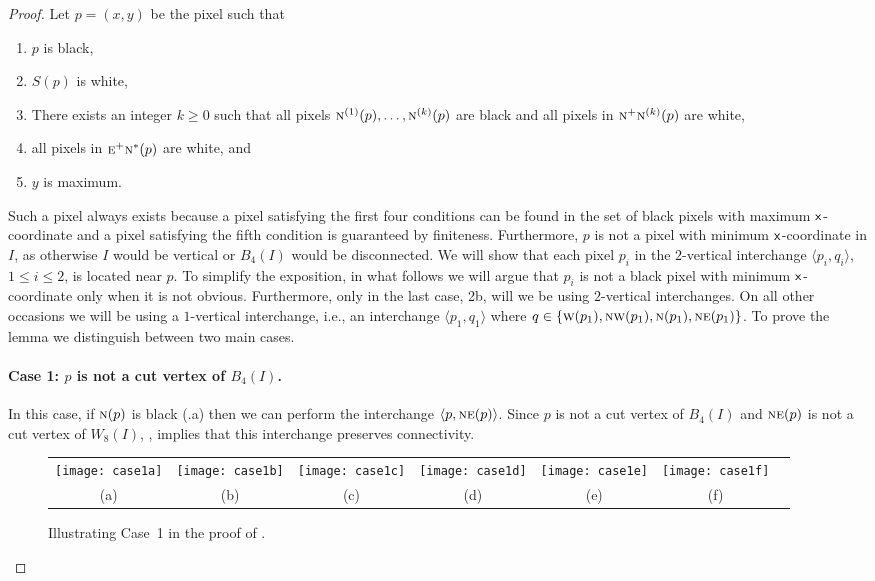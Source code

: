 \documentclass[lotsofwhite,charterfonts]{patmorin}
\newcommand{\N}{\textsc{n}}
\newcommand{\NE}{\textsc{ne}}
\newcommand{\E}{\textsc{e}}
\newcommand{\W}{\textsc{w}}
\newcommand{\NW}{\textsc{nw}}
\newcommand{\x}{\ensuremath{\protect\textup{\textsf{x}}}}
\newcommand{\ic}[2]{\langle #1,#2 \rangle}
\begin{document}
\begin{proof}
Let $p=(x,y)$ be the pixel such that
\begin{enumerate}
  \item $p$ is black, 
  \item $S(p)$ is white,
  \item There exists an integer $k\ge 0$ such that all pixels
	$\N^{(1)}(p),\ldots,\N^{(k)}(p)$ are black and 
        all pixels in $\N^{+}\N^{(k)}(p)$ are white,
  \item all pixels in $\E^+\N^*(p)$ are white, and
  \item $y$ is maximum.
\end{enumerate}
Such a pixel always exists because a pixel satisfying the first four
conditions can be found in the set of black pixels with maximum
\x-coordinate and a pixel satisfying the fifth condition is guaranteed
by finiteness. Furthermore, $p$ is not a pixel with minimum
\x-coordinate in $I$, as otherwise $I$ would be vertical or $B_4(I)$
would be disconnected. We will show that each pixel $p_i$ in the
$2$-vertical interchange $\ic{p_i}{q_i}$,$1\leq i\leq 2$, is
located near $p$. To simplify the exposition,
in what follows we will argue that $p_i$ is not a black pixel with
minimum \x-coordinate only when it is not obvious. Furthermore, only
in the last case, 2b, will we be using $2$-vertical
interchanges. On all other occasions we will be using a $1$-vertical
interchange, i.e., an interchange $\ic{p_1}{q_1}$ where
$q\in\{\W(p_1),\NW(p_1),\N(p_1),\NE(p_1)\}$. To prove the lemma we
distinguish between two main cases.


\paragraph{Case 1: $p$ is not a cut vertex of $B_4(I)$.}  In this
case, if $\N(p)$ is black (.a) then we can perform
the interchange $\ic{p}{\NE(p)}$.  Since $p$ is not a cut vertex of
$B_4(I)$ and $\NE(p)$ is not a cut vertex of $W_8(I)$,
, implies that this interchange preserves
connectivity.

\begin{figure}[htbp]
\begin{center}
\begin{tabular}{ccccccc}
\texttt{[image: case1a]} & 
\texttt{[image: case1b]} & 
\texttt{[image: case1c]} & 
\texttt{[image: case1d]} & 
\texttt{[image: case1e]} & 
\texttt{[image: case1f]} \\
(a) & (b) & (c) & (d) & (e) & (f)
\end{tabular}
\end{center}
\caption{Illustrating Case~1 in the proof of .}
\end{figure}



\end{proof}
\end{document}
